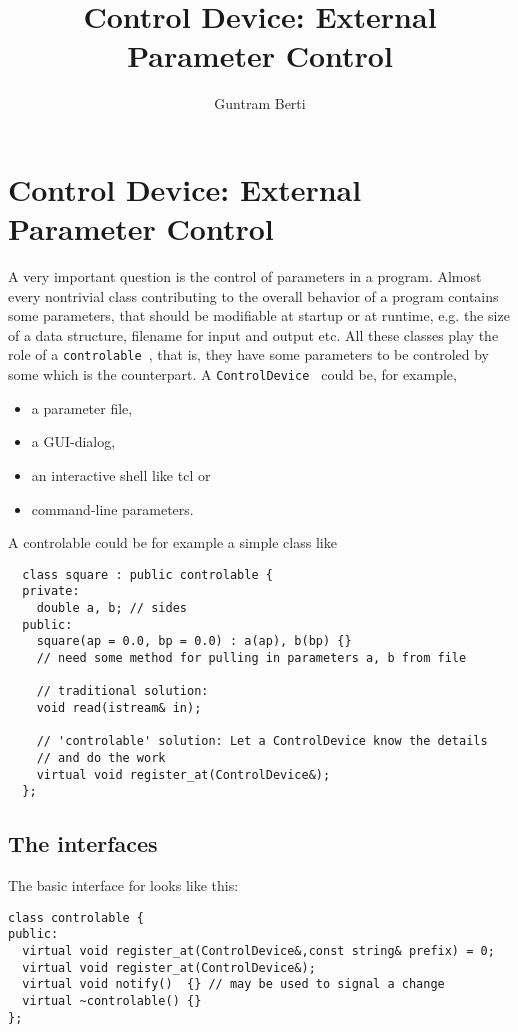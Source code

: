 \documentclass{article}
\title{Control Device: External Parameter Control}
\author{Guntram Berti}
\begin{document}
 \section{Control Device: External Parameter Control}
 
 A very important question is the control of parameters
 in a program. Almost every nontrivial class contributing to the
 overall behavior of a program contains some parameters, that should
 be modifiable at startup or at runtime, e.g. the size of a data structure,
 filename for input and output etc. All these classes play the role of a
 {\tt  controlable }, that is, they have some parameters to be 
 controled by some {\tt  {}} which is the counterpart.
 A {\tt  ControlDevice } could be, for example,

 \begin{itemize}
 \item  a parameter file,
 \item  a GUI-dialog,
 \item  an interactive shell like tcl or
 \item  command-line parameters.
 \end{itemize}

A controlable could be for example a simple class like 
\begin{verbatim}
  class square : public controlable {
  private:
    double a, b; // sides
  public:
    square(ap = 0.0, bp = 0.0) : a(ap), b(bp) {}
    // need some method for pulling in parameters a, b from file

    // traditional solution:
    void read(istream& in);

    // 'controlable' solution: Let a ControlDevice know the details
    // and do the work
    virtual void register_at(ControlDevice&);
  };
\end{verbatim}

\subsection{The interfaces}
The basic interface  for {\tt {}} looks like this:

\begin{verbatim}
class controlable {
public:
  virtual void register_at(ControlDevice&,const string& prefix) = 0;
  virtual void register_at(ControlDevice&);
  virtual void notify()  {} // may be used to signal a change
  virtual ~controlable() {}
};
\end{verbatim}
    
\end{document}
